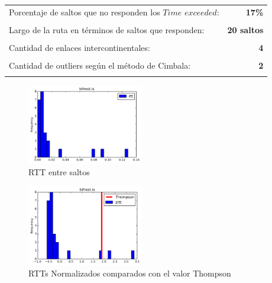 \begin{center}
\begin{tabular}{p{6.5cm}r}
Porcentaje de saltos que no responden los $Time$ $exceeded$: & \textbf{17\%} \\ \\ 
Largo de la ruta en términos de saltos que responden: &\textbf{20 saltos} \\ \\
Cantidad de enlaces intercontinentales: & \textbf{4} \\ \\
Cantidad de outliers según el método de Cimbala: & \textbf{2} \\ \\
\end{tabular}
\end{center}

\begin{figure}[H]
  \centering
    \includegraphics[width=0.45\textwidth]{histogramas_rtt/bifrost-is.png}
  \caption{RTT entre saltos}
  \label{entropia-s}
\end{figure}

\begin{center}

\end{center}

\begin{figure}[H]
  \centering
    \includegraphics[width=0.45\textwidth]{histogramas_thompson/bifrost-is.png}
  \caption{RTTs Normalizados comparados con el valor Thompson}
  \label{entropia-s}
\end{figure}

